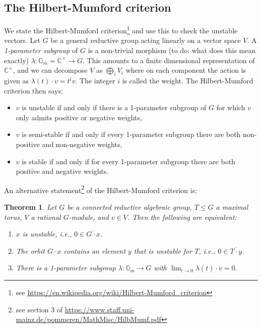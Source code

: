 \documentclass[12pt]{amsart}
\newcommand{\C}{\mathbb{C}}
\newtheorem{theorem}{Theorem}%
\theoremstyle{remark}
\theoremstyle{remark}
\begin{document}
\subsection*{The Hilbert-Mumford criterion}
We state the Hilbert-Mumford criterion\footnote{see \url{https://en.wikipedia.org/wiki/Hilbert-Mumford\_criterion}} and use this to check the unstable vectors.
Let $G$ be a general reductive group acting linearly on a vector space $V$.
A \emph{1-parameter subgroup} of $G$ is a non-trivial morphism (to do: what does this mean exactly) $\lambda: \mathbb{G}_m = \C^\times \to G$.
This amounts to a finite dimensional representation of $\C^\times$, and we can decompose $V$ as $\bigoplus_i V_i$ where on each component the action is given as $\lambda(t) \cdot v = t^i v$.
The integer $i$ is called the weight.
The Hilbert-Mumford criterion then says:
\begin{itemize}[label=-]
\item
$v$ is unstable if and only if there is a 1-parameter subgroup of $G$ for which $v$ only admits positive or negative weights,

\item 
$v$ is semi-stable if and only if every 1-parameter subgroup there are both non-positive and non-negative weights,

\item
$v$ is stable if and only if for every 1-parameter subgroup there are both positive and negative weights.
\end{itemize}
An alternative statement\footnote{see section 3 of \url{https://www.staff.uni-mainz.de/pommeren/MathMisc/HilbMumf.pdf}} of the Hilbert-Mumford criterion is:
\begin{theorem}
Let $G$ be a connected reductive algebraic group, $T \le G$ a maximal torus, $V$ a rational $G$-module, and $v \in V$.
Then the following are equivalent:
\begin{enumerate}[label=(\roman*)]
\item
$x$ is unstable, i.e., $0 \in \overline{G \cdot x}$.

\item
The orbit $G \cdot x$ contains an element $y$ that is unstable for $T$, i.e., $0 \in \overline{T \cdot y}$.

\item
There is a 1-parameter subgroup $\lambda: \mathbb{G}_m \to G$ with $\lim_{t \to 0} \lambda(t) \cdot v = 0$.
\end{enumerate}
\end{theorem}
\end{document}
